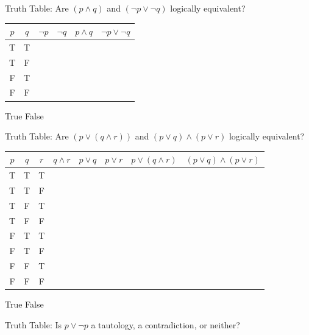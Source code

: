 \documentclass[letterpaper]{exam}
\begin{document}
\begin{questions}
        
        \question Truth Table: Are $(p \land q)$ and $(\neg p \lor \neg q)$ logically equivalent?

        \begin{tabular}{|c|c|c|c|c|c|}
            \hline
            $p$ & $q$ & $\neg p$ & $\neg q$ & $p \land q$& $\neg p \lor \neg q$\\ \hline
            T & T &  &  &  &\\ \hline
            T & F &  &  &  &\\ \hline
            F & T &  &  &  &\\ \hline
            F & F &  &  &  &\\ \hline
        \end{tabular}

        \begin{checkboxes}
            \choice True
            \choice False
        \end{checkboxes}



        
        \question Truth Table: Are $(p \lor (q \land r))$ and $(p \lor q)\land(p \lor r)$ logically equivalent?

        \begin{tabular}{|c|c|c|c|c|c|c|c|}
            \hline
            $p$ & $q$ & $r$ & $q \land r$ & $p \lor q$ & $p \lor r$ & $p \lor (q \land r)$ & $(p \lor q)\land(p \lor r)$\\ \hline
            T & T & T &  &  &  &  &\\ \hline
            T & T & F &  &  &  &  &\\ \hline
            T & F & T &  &  &  &  &\\ \hline
            T & F & F &  &  &  &  &\\ \hline
            F & T & T &  &  &  &  &\\ \hline
            F & T & F &  &  &  &  &\\ \hline
            F & F & T &  &  &  &  &\\ \hline
            F & F & F &  &  &  &  &\\ \hline
        \end{tabular}
        
        \begin{checkboxes}
            \choice True
            \choice False
        \end{checkboxes}



        
        \question Truth Table: Is $p \lor \neg p$ a tautology, a contradiction, or neither?


\end{questions}
\end{document}
